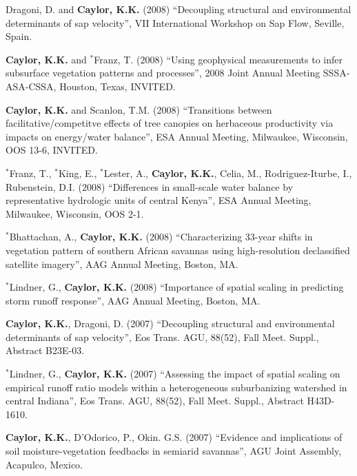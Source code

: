 \documentclass[10pt]{article}
\begin{document}
\begin{etaremune}
\item Dragoni, D. and \textbf{Caylor, K.K.} (2008) ``Decoupling structural and environmental determinants of sap velocity'', VII International Workshop on Sap Flow, Seville, Spain.

\item \textbf{Caylor, K.K.} and $^{*}$Franz, T. (2008) ``Using geophysical measurements to infer subsurface vegetation patterns and processes'', 2008 Joint Annual Meeting SSSA-ASA-CSSA, Houston, Texas, INVITED.

\item \textbf{Caylor, K.K.} and Scanlon, T.M. (2008) ``Transitions between facilitative/competitve effects of tree canopies on herbaceous productivity via impacts on energy/water balance'', ESA Annual Meeting, Milwaukee, Wisconsin, OOS 13-6, INVITED.

\item $^{*}$Franz, T., $^{*}$King, E., $^{*}$Lester, A., \textbf{Caylor, K.K.}, Celia, M., Rodriguez-Iturbe, I., Rubenstein, D.I. (2008) ``Differences in small-scale water balance by representative hydrologic units of central Kenya'', ESA Annual Meeting, Milwaukee, Wisconsin, OOS 2-1.

\item $^{*}$Bhattachan, A., \textbf{Caylor, K.K.} (2008) ``Characterizing 33-year shifts in vegetation pattern of southern African savannas using high-resolution declassified satellite imagery'', AAG Annual Meeting, Boston, MA. 

\item $^{*}$Lindner, G., \textbf{Caylor, K.K.} (2008) ``Importance of spatial scaling in predicting storm runoff response'', AAG Annual Meeting, Boston, MA.

\item \textbf{Caylor, K.K.}, Dragoni, D. (2007) ``Decoupling structural and environmental determinants of sap velocity'', Eos Trans. AGU, 88(52), Fall Meet. Suppl., Abstract B23E-03.

\item $^{*}$Lindner, G., \textbf{Caylor, K.K.} (2007) ``Assessing the impact of spatial scaling on empirical runoff ratio models within a heterogeneous suburbanizing watershed in central Indiana'', Eos Trans. AGU, 88(52), Fall Meet. Suppl., Abstract H43D-1610.

\item \textbf{Caylor, K.K.}, D'Odorico, P., Okin. G.S. (2007) ``Evidence and implications of soil moisture-vegetation feedbacks in semiarid savannas'', AGU Joint Assembly, Acapulco, Mexico.


\end{etaremune}
\end{document}
